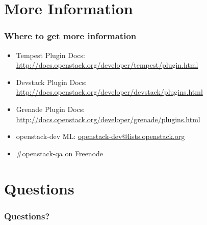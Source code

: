 \documentclass[aspectratio=169,11pt,hyperref={colorlinks=true}]{beamer}
\begin{document}
\section{More Information}
\begin{frame}
\frametitle{Where to get more information}
    \begin{itemize}
        \item Tempest Plugin Docs: \href{http://docs.openstack.org/developer/tempest/plugin.html}{http://docs.openstack.org/developer/tempest/plugin.html}
        \item Devstack Plugin Docs: \href{http://docs.openstack.org/developer/devstack/plugins.html}{http://docs.openstack.org/developer/devstack/plugins.html}
        \item Grenade Plugin Docs: \href{http://docs.openstack.org/developer/grenade/plugins.html}{http://docs.openstack.org/developer/grenade/plugins.html}
        \item openstack-dev ML: \href{mailto:openstack-dev@lists.openstack.org}{openstack-dev@lists.openstack.org}
        \item \#openstack-qa on Freenode
    \end{itemize}
\end{frame}

\section{Questions}
\begin{frame}
\frametitle{Questions?}
\end{frame}

\end{document}
